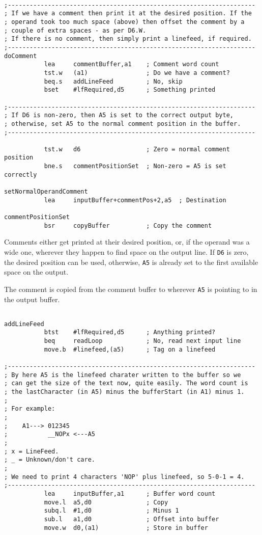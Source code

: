 \begin{lstlisting}[firstnumber=last,caption={ASMReformat Source - Writing Comments}]

;--------------------------------------------------------------------
; If we have a comment then print it at the desired position. If the
; operand took too much space (above) then offset the comment by a
; couple of extra spaces - as per D6.W.
; If there is no comment, then simply print a linefeed, if required.
;--------------------------------------------------------------------
doComment
           lea     commentBuffer,a1    ; Comment word count
           tst.w   (a1)                ; Do we have a comment?
           beq.s   addLineFeed         ; No, skip
           bset    #lfRequired,d5      ; Something printed

;--------------------------------------------------------------------
; If D6 is non-zero, then A5 is set to the correct output byte,
; otherwise, set A5 to the normal comment position in the buffer.
;--------------------------------------------------------------------

           tst.w   d6                  ; Zero = normal comment position
           bne.s   commentPositionSet  ; Non-zero = A5 is set correctly

setNormalOperandComment
           lea     inputBuffer+commentPos+2,a5  ; Destination

commentPositionSet
           bsr     copyBuffer          ; Copy the comment
\end{lstlisting}

Comments either get printed at their desired position, or, if the operand was a wide one, wherever they happen to find space on the output line. If \texttt{D6} is zero, the desired position can be used, otherwise, \texttt{A5} is already set to the first available space on the output.

The comment is copied from the comment buffer to wherever \texttt{A5} is pointing to in the output buffer.

\begin{lstlisting}[firstnumber=last,caption={ASMReformat Source - End of Line Feed}]

addLineFeed
           btst    #lfRequired,d5      ; Anything printed?
           beq     readLoop            ; No, read next input line
           move.b  #linefeed,(a5)      ; Tag on a linefeed

;--------------------------------------------------------------------
; By here A5 is the linefeed charater written to the buffer so we 
; can get the size of the text now, quite easily. The word count is
; the lastCharacter (in A5) minus the bufferStart (in A1) minus 1.
;
; For example: 
;
;    A1---> 012345
;           __NOPx <---A5
;
; x = LineFeed.
; _ = Unknown/don't care.
; 
; We need to print 4 characters 'NOP' plus linefeed, so 5-0-1 = 4.
;--------------------------------------------------------------------
           lea     inputBuffer,a1      ; Buffer word count
           move.l  a5,d0               ; Copy 
           subq.l  #1,d0               ; Minus 1
           sub.l   a1,d0               ; Offset into buffer
           move.w  d0,(a1)             ; Store in buffer
\end{lstlisting}

